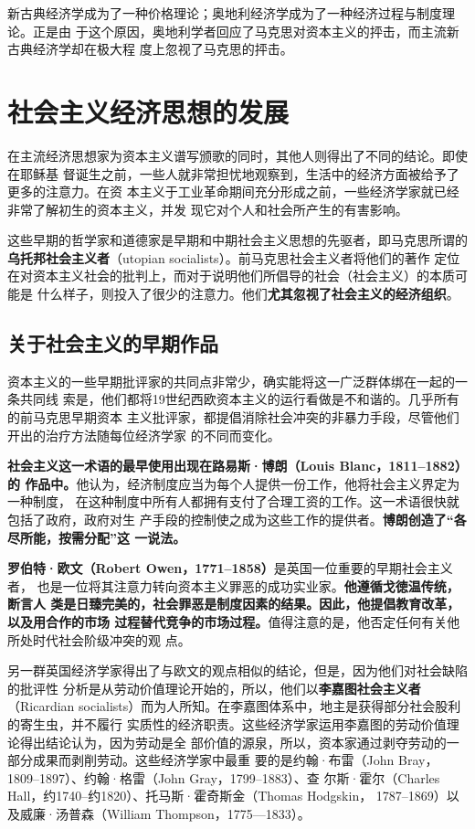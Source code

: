 新古典经济学成为了一种价格理论；奥地利经济学成为了一种经济过程与制度理论。正是由
于这个原因，奥地利学者回应了马克思对资本主义的抨击，而主流新古典经济学却在极大程
度上忽视了马克思的抨击。

\section{社会主义经济思想的发展}

在主流经济思想家为资本主义谱写颁歌的同时，其他人则得出了不同的结论。即使在耶稣基
督诞生之前，一些人就非常担忧地观察到，生活中的经济方面被给予了更多的注意力。在资
本主义于工业革命期间充分形成之前，一些经济学家就已经非常了解初生的资本主义，并发
现它对个人和社会所产生的有害影响。

这些早期的哲学家和道德家是早期和中期社会主义思想的先驱者，即马克思所谓的
\textbf{乌托邦社会主义者}（utopian socialists）。前马克思社会主义者将他们的著作
定位在对资本主义社会的批判上，而对于说明他们所倡导的社会（社会主义）的本质可能是
什么样子，则投入了很少的注意力。他们\textbf{尤其忽视了社会主义的经济组织}。

\subsection{关于社会主义的早期作品}

资本主义的一些早期批评家的共同点非常少，确实能将这一广泛群体绑在一起的一条共同线
索是，他们都将19世纪西欧资本主义的运行看做是不和谐的。几乎所有的前马克思早期资本
主义批评家，都提倡消除社会冲突的非暴力手段，尽管他们开出的治疗方法随每位经济学家
的不同而变化。

\textbf{社会主义这一术语的最早使用出现在路易斯·博朗（Louis Blanc，1811--1882）的
作品中。}他认为，经济制度应当为每个人提供一份工作，他将社会主义界定为一种制度，
在这种制度中所有人都拥有支付了合理工资的工作。这一术语很快就包括了政府，政府对生
产手段的控制使之成为这些工作的提供者。\textbf{博朗创造了“各尽所能，按需分配”这
一说法。}

\textbf{罗伯特·欧文（Robert Owen，1771--1858）}是英国一位重要的早期社会主义者，
也是一位将其注意力转向资本主义罪恶的成功实业家。\textbf{他遵循戈徳温传统，断言人
类是日臻完美的，社会罪恶是制度因素的结果。因此，他提倡教育改革，以及用合作的市场
过程替代竞争的市场过程。}值得注意的是，他否定任何有关他所处时代社会阶级冲突的观
点。

另一群英国经济学家得出了与欧文的观点相似的结论，但是，因为他们对社会缺陷的批评性
分析是从劳动价值理论开始的，所以，他们以\textbf{李嘉图社会主义者}（Ricardian
socialists）而为人所知。在李嘉图体系中，地主是获得部分社会股利的寄生虫，并不履行
实质性的经济职责。这些经济学家运用李嘉图的劳动价值理论得出结论认为，因为劳动是全
部价值的源泉，所以，资本家通过剥夺劳动的一部分成果而剥削劳动。这些经济学家中最重
要的是约翰·布雷（John Bray，1809--1897）、约翰·格雷（John Gray，1799--1883）、查
尔斯·霍尔（Charles Hall，约1740--约1820）、托马斯·霍奇斯金（Thomas Hodgskin，
1787--1869）以及威廉·汤普森（William Thompson，1775—1833）。

